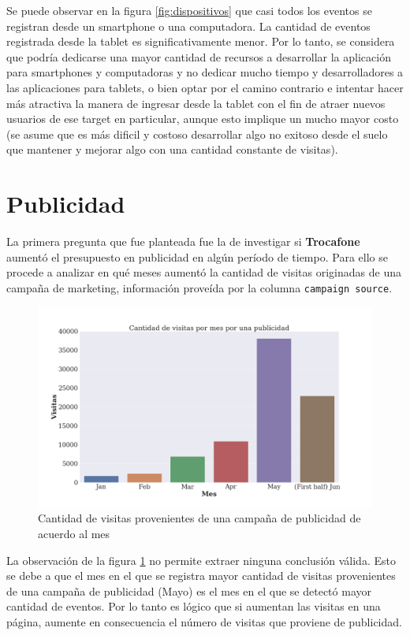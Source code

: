 \documentclass[a4paper]{article}
\begin{document}
Se puede observar en la figura \ref{fig:dispositivos} que casi todos los eventos se registran desde un smartphone o una computadora. La cantidad de eventos registrada desde la tablet es significativamente menor. Por lo tanto, se considera que podría dedicarse una mayor cantidad de recursos a desarrollar la aplicación para smartphones y computadoras y no dedicar mucho tiempo y desarrolladores a las aplicaciones para tablets, o bien optar por el camino contrario e intentar hacer más atractiva la manera de ingresar desde la tablet con el fin de atraer nuevos usuarios de ese target en particular, aunque esto implique un mucho mayor costo (se asume que es más dificil y costoso desarrollar algo no exitoso desde el suelo que mantener y mejorar algo con una cantidad constante de visitas).

\section{Publicidad}

La primera pregunta que fue planteada fue la de investigar si \textbf{Trocafone} aumentó el presupuesto en publicidad en algún período de tiempo. Para ello se procede a analizar en qué meses aumentó la cantidad de visitas originadas de una campaña de marketing, información proveída por la columna \texttt{campaign source}.

\begin{figure}[h!]
	\includegraphics[width=\linewidth]{figures/16-presupuesto-barplot.png}
	\caption{Cantidad de visitas provenientes de una campaña de publicidad de acuerdo al mes}
	\label{fig:publicidad}
\end{figure}

La observación de la figura \ref{fig:publicidad} no permite extraer ninguna conclusión válida. Esto se debe a que el mes en el que se registra mayor cantidad de visitas provenientes de una campaña de publicidad (Mayo) es el mes en el que se detectó mayor cantidad de eventos. Por lo tanto es lógico que si aumentan las visitas en una página, aumente en consecuencia el número de visitas que proviene de publicidad.
\end{document}
